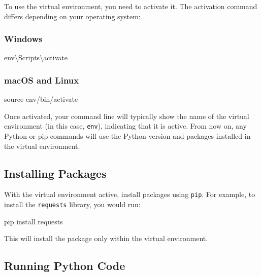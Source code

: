 \documentclass[
  letterpaper,
  DIV=11,
  numbers=noendperiod]{scrreprt}
\newenvironment{Shaded}{\begin{snugshade}}{\end{snugshade}}
\newcommand{\BuiltInTok}[1]{\textcolor[rgb]{0.00,0.23,0.31}{#1}}
\newcommand{\DataTypeTok}[1]{\textcolor[rgb]{0.68,0.00,0.00}{#1}}
\newcommand{\ExtensionTok}[1]{\textcolor[rgb]{0.00,0.23,0.31}{#1}}
\newcommand{\FunctionTok}[1]{\textcolor[rgb]{0.28,0.35,0.67}{#1}}
\newcommand{\NormalTok}[1]{\textcolor[rgb]{0.00,0.23,0.31}{#1}}
\begin{document}
To use the virtual environment, you need to activate it. The activation
command differs depending on your operating system:

\subsubsection{Windows}\label{windows-1}

\begin{Shaded}
\begin{Highlighting}[]
\FunctionTok{env}\DataTypeTok{\textbackslash{}S}\NormalTok{cripts}\DataTypeTok{\textbackslash{}a}\NormalTok{ctivate}
\end{Highlighting}
\end{Shaded}

\subsubsection{macOS and Linux}\label{macos-and-linux}

\begin{Shaded}
\begin{Highlighting}[]
\BuiltInTok{source}\NormalTok{ env/bin/activate}
\end{Highlighting}
\end{Shaded}

Once activated, your command line will typically show the name of the
virtual environment (in this case, \texttt{env}), indicating that it is
active. From now on, any Python or pip commands will use the Python
version and packages installed in the virtual environment.

\subsection{Installing Packages}\label{installing-packages}

With the virtual environment active, install packages using
\texttt{pip}. For example, to install the \texttt{requests} library, you
would run:

\begin{Shaded}
\begin{Highlighting}[]
\ExtensionTok{pip}\NormalTok{ install requests}
\end{Highlighting}
\end{Shaded}

This will install the package only within the virtual environment.

\subsection{Running Python Code}\label{running-python-code}
\end{document}
